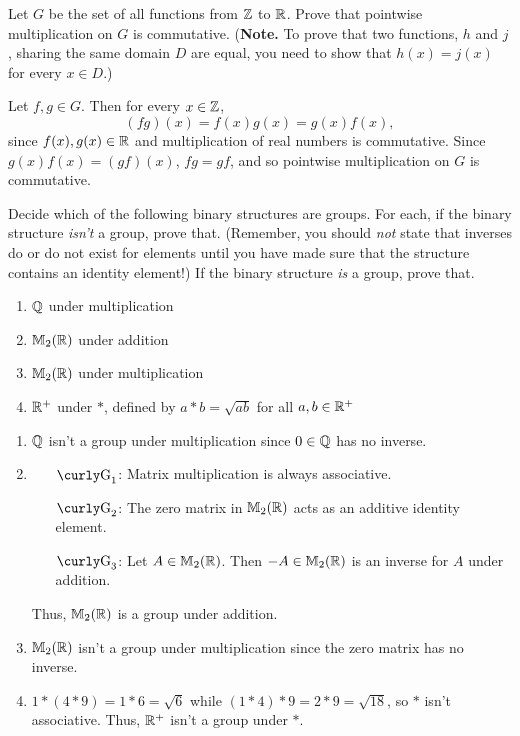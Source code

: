 \begin{exercise}[ID=2F]
Let $G$ be the set of all functions from $\mathbb{Z}$ to $\mathbb{R}$.  Prove that pointwise multiplication on $G$ is commutative. (\textbf{Note.} To prove that two functions, $h$ and $j$, sharing the same domain $D$ are equal, you need to show that $h(x)=j(x)$ for every $x\in D$.)
\end{exercise}

\begin{solution}[print=true]
Let $f,g\in G$.  Then for every $x\in \mathbb{Z}$,
$$(fg)(x)=f(x)g(x)=g(x)f(x),$$
since $f(x), g(x)\in \mathbb{R}$ and multiplication of real numbers is commutative. Since $g(x)f(x)=(gf)(x)$,
$fg=gf$, and so pointwise multiplication on $G$ is commutative.
\end{solution}

\begin{exercise}[ID=2J]
Decide which of the following binary structures are groups.  For each, if the binary structure \textit{isn't} a group, prove that. (Remember, you should \textit{not} state that inverses do or do not exist for elements until you have made sure that the structure contains an identity element!) If the binary structure {\it is} a group, prove that.

\begin{enumerate}
\item $\mathbb{Q}$ under multiplication
\item $\mathbb{M}_2(\mathbb{R})$ under addition
\item $\mathbb{M}_2(\mathbb{R})$ under multiplication
\item $\mathbb{R}^+$ under $*$, defined by $a*b=\sqrt{ab}$ for all $a,b\in \mathbb{R}^+$
\end{enumerate}
\end{exercise}

\begin{solution}[print=true]
\begin{enumerate}
\item $\mathbb{Q}$ isn't a group under multiplication since $0\in \mathbb{Q}$ has no inverse.
\item
\begin{enumerate}
\item[$\G_1$:] Matrix multiplication is always associative.
\item[$\G_2$:] The zero matrix in $\mathbb{M}_2(\mathbb{R})$ acts as an additive identity element.
\item[$\G_3$:] Let $A\in \mathbb{M}_2(\mathbb{R})$.  Then $-A\in \mathbb{M}_2(\mathbb{R})$ is an inverse for $A$ under addition.
\end{enumerate}
Thus, $\mathbb{M}_2(\mathbb{R})$ is a group under addition.

\item $\mathbb{M}_2(\mathbb{R})$ isn't a group under multiplication since the zero matrix has no inverse.
\item $1*(4*9)=1*6=\sqrt{6}$ while $(1*4)*9=2*9=\sqrt{18}$, so $*$ isn't associative.  Thus, $\mathbb{R}^+$ isn't a group under $*$.
\end{enumerate}
\end{solution}

